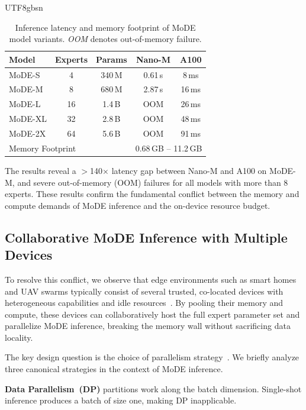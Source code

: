 \documentclass[conference]{IEEEtran}
\begin{document}
\begin{CJK*}{UTF8}{gbsn}
\begin{table}[t]
  \caption{Inference latency and memory footprint of MoDE model variants.
           \textit{OOM} denotes out-of-memory failure.}
  \label{tab:profiling}
  \centering
  \renewcommand{\arraystretch}{1.2}
  \begin{tabular}{lcccc}
    \toprule
    \textbf{Model} & \textbf{Experts} & \textbf{Params} &
    \textbf{Nano-M} & \textbf{A100} \\
    \midrule
    MoDE-S  & 4  & 340\,M  & 0.61\,s & 8\,ms  \\
    MoDE-M  & 8  & 680\,M  & 2.87\,s & 16\,ms \\
    MoDE-L  & 16 & 1.4\,B  & OOM     & 26\,ms \\
    MoDE-XL & 32 & 2.8\,B  & OOM     & 48\,ms \\
    MoDE-2X & 64 & 5.6\,B  & OOM     & 91\,ms \\
    \midrule
    \multicolumn{3}{l}{Memory Footprint} &
    \multicolumn{2}{c}{0.68\,GB -- 11.2\,GB} \\
    \bottomrule
  \end{tabular}
\end{table}

The results reveal a $>$140$\times$ latency gap between Nano-M and
A100 on MoDE-M, and severe out-of-memory (OOM) failures for all
models with more than 8 experts.  These results confirm the
fundamental conflict between the memory and compute demands of MoDE
inference and the on-device resource budget.

\subsection{Collaborative MoDE Inference with Multiple Devices}
\label{sec:bg_collab}

To resolve this conflict, we observe that edge environments such as
smart homes and UAV swarms typically consist of several trusted,
co-located devices with heterogeneous capabilities and idle
resources~\cite{zeng2020coedge,king2023sasha}.  By pooling their
memory and compute, these devices can collaboratively host the full
expert parameter set and parallelize MoDE inference, breaking the
memory wall without sacrificing data locality.

The key design question is the choice of parallelism
strategy~\cite{shoeybi2019megatron,li2021sequence}.  We briefly
analyze three canonical strategies in the context of MoDE inference.

\textbf{Data Parallelism~(DP)} partitions work along the batch
dimension.  Single-shot inference produces a batch of size one,
making DP inapplicable.


\end{CJK*}
\end{document}
